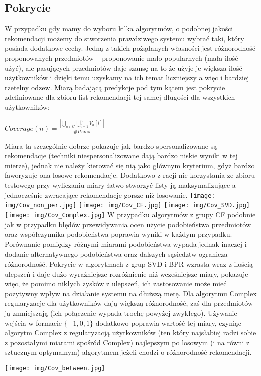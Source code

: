 \documentclass{pracamgr}
\begin{document}
   \subsection{Pokrycie}
    W przypadku gdy mamy do wyboru kilka algorytmów, o podobnej jakości rekomendacji możemy do stworzenia prawdziwego systemu wybrać taki,
    który posiada dodatkowe cechy. Jedną z takich pożądanych własności jest różnorodność proponowanych przedmiotów -- proponowanie mało popularnych
    (mała ilość użyć), ale pasujących przedmiotów daje szansę na to że użyje je większa ilość użytkowników i dzięki temu uzyskamy na ich temat liczniejszy
    a więc i bardziej rzetelny odzew. Miarą badającą predykcje pod tym kątem jest pokrycie zdefiniowane dla zbioru list rekomendacji tej samej
    długości dla wszystkich użytkowników:
    \begin{center}
     $Coverage(n)=\frac{|\bigcup\limits_{u\in U}\bigcup\limits_{i=1}^{n}V_u[i]|}{\#Items}$
    \end{center}
    Miara ta szczególnie dobrze pokazuje jak bardzo spersonalizowane są rekomendacje (techniki niespersonalizowane dają bardzo niskie wyniki w tej mierze),
    jednak nie należy kierować się nią jako głównym kryterium, gdyż bardzo faworyzuje ona losowe rekomendacje.
    Dodatkowo z racji nie korzystania ze zbioru testowego przy wyliczaniu miary łatwo stworzyć listy ją maksymalizujące
    a jednocześnie zwracające rekomendacje gorsze niż losowanie.\newline
    \texttt{[image: img/Cov\_non\_per.jpg]}
    \texttt{[image: img/Cov\_CF.jpg]}\newline
    \texttt{[image: img/Cov\_SVD.jpg]}
    \texttt{[image: img/Cov\_Complex.jpg]}\newline
    W przypadku algorytmów z grupy CF podobnie jak w przypadku błędów przewidywania ocen użycie podobieństwa przedmiotów oraz współczynnika podobieństwa
    poprawia wyniki w każdym przypadku. Porównanie pomiędzy różnymi miarami podobieństwa wypada jednak inaczej i dodanie alternatywnego podobieństwa oraz dalszych
    sąsiedztw ogranicza różnorodność.
    Pokrycie w algorytmach z grup SVD i BPR wzrasta wraz z ilością ulepszeń i daje dużo wyraźniejsze rozróżnienie niż wcześniejsze miary, pokazuje więc, 
    że pomimo nikłych zysków z ulepszeń, ich zastosowanie może mieć pozytywny wpływ na działanie systemu na dłuższą metę.
    Dla algorytmu Complex regularyzacje dla użytkowników dają większą różnorodność, zaś dla przedmiotów ją zmniejszają
    (ich połączenie wypada trochę powyżej zwykłego). Używanie wejścia w formacie $\{-1,0,1\}$ dodatkowo poprawia wartość tej miary,
    czyniąc algorytm Complex z regularyzacją użytkowników (ten który najsłabiej radzi sobie z pozostałymi miarami spośród Complex)
    najlepszym po losowym (i na równi z sztucznym optymalnym) algorytmem jeżeli chodzi o różnorodność rekomendacji.
    \begin{center}
    \texttt{[image: img/Cov\_between.jpg]}
    \end{center}
\end{document}
